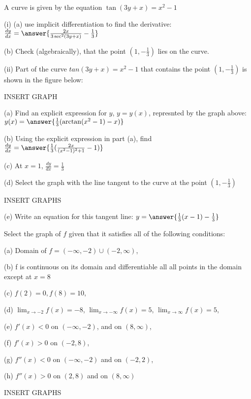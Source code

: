 \documentclass{ximera}
\begin{document}
\begin{exercise}
A curve is given by the equation $\tan(3y+x)=x^2-1$

(i) (a) use implicit differentiation to find the derivative: $\frac{dy}{dx}=\answer{\frac{2x}{3\sec^2(3y+x)}-\frac{1}{3}}$

(b) Check (algebraically), that the point $(1,-\frac{1}{3})$ lies on the curve.

(ii) Part of the curve $tan(3y+x)=x^2-1$ that contains the point $(1,-\frac{1}{3})$ is shown in the figure below:

INSERT GRAPH

(a) Find an explicit expression for $y$, $y=y(x)$, represnted by the graph above: $y(x)=\answer{\frac{1}{3}(\arctan(x^2-1)-x)}$

(b) Using the explicit expression in part (a), find $\frac{dy}{dx}=\answer{\frac{1}{3}(\frac{2x}{(x^2-1)^2+1}-1)}$

(c) At $x=1$, $\frac{dy}{dx}=\frac{1}{3}$

(d) Select the graph with the line tangent to the curve at the point $(1,-\frac{1}{3})$

INSERT GRAPHS

(e) Write an equation for this tangent line: $y=\answer{\frac{1}{3}(x-1)-\frac{1}{3}}$
\end{exercise}

\begin{exercise}
Select the graph of $f$ given that it satisfies all of the following conditions:

(a) Domain of $f=(-\infty,-2)\cup (-2,\infty)$,

(b) f is continuous on its domain and differentiable all all points in the domain except at $x=8$

(c) $f(2)=0, f(8)=10$,

(d) $\lim_{x\to -2} f(x)=-8$, $\lim_{x\to-\infty}f(x)=5$, $\lim_{x\to\infty}f(x)=5$,

(e) $f'(x)<0$ on $(-\infty,-2)$, and on $(8,\infty)$,

(f) $f'(x)>0$ on $(-2,8)$,

(g) $f''(x)<0$ on $(-\infty,-2)$ and on $(-2,2)$,

(h) $f''(x)>0$ on $(2,8)$ and on $(8,\infty)$

INSERT GRAPHS
\end{exercise}
\end{document}
